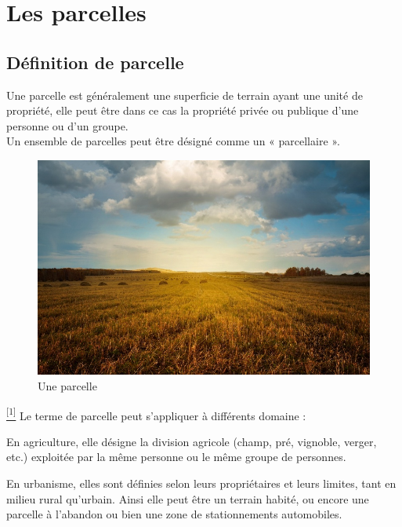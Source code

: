 \documentclass[12pt, openany]{report}
\begin{document}
\section{Les parcelles}

\subsection{Définition de parcelle}
Une parcelle est généralement une superficie de terrain ayant une unité de propriété, elle peut être dans ce cas la propriété privée ou publique d'une personne ou d'un groupe.\\
Un ensemble de parcelles peut être désigné comme un « parcellaire ». 

\begin{figure}[hp]
\centering
\includegraphics[scale=0.5]{parcelle2.jpg}
\caption{Une parcelle}
\end{figure}

\hyperref[sec:refs]{\textsuperscript{[1]}} 
Le terme de parcelle peut s'appliquer à différents domaine :

\begin{mylist}

\item En agriculture, elle désigne la division agricole (champ, pré, vignoble, verger, etc.) exploitée par la même personne ou le même groupe de personnes.


\item En urbanisme, elles sont définies selon leurs propriétaires et leurs limites, tant en milieu rural qu'urbain. Ainsi elle peut être un terrain habité, ou encore une parcelle à l'abandon ou bien une zone de stationnements automobiles. 

\end{mylist}
\end{document}
